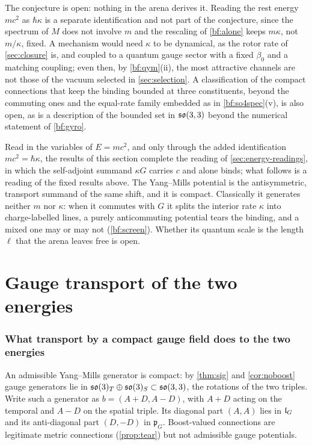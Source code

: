 The conjecture is open: nothing in the arena derives it. Reading the rest energy $mc^2$ as $\hbar\kappa$ is a separate identification and not part of
the conjecture, since the spectrum of $M$ does not involve $m$ and the rescaling of \cref{bf:alone} keeps $m\kappa$, not $m/\kappa$, fixed. A
mechanism would need $\kappa$ to be dynamical, as the rotor rate of \cref{sec:closure} is, and coupled to a quantum gauge sector with a fixed
$\beta_0$ and a matching coupling; even then, by \cref{bf:qym}(ii), the most attractive channels are not those of the vacuum selected in
\cref{sec:selection}. A classification of the compact connections that keep the binding bounded at three constituents, beyond the commuting ones and the equal-rate
family embedded as in \cref{bf:so4spec}(v), is also open, as is a description of the bounded set in $\mathfrak{so}(3,3)$ beyond the numerical statement of
\cref{bf:gyro}.

Read in the variables of $E=mc^2$, and only through the added identification $mc^2=\hbar\kappa$, the results of this section complete the reading
of \cref{sec:energy-readings}, in which the self-adjoint summand $\kappa G$ carries $c$ and alone binds; what follows is a reading of the fixed
results above. The Yang--Mills potential is the antisymmetric, transport summand of the same shift, and it is compact. Classically it generates neither $m$ nor $\kappa$: when it commutes with $G$ it splits the interior rate $\kappa$
into charge-labelled lines, a purely anticommuting potential tears the binding, and a mixed one may or may not (\cref{bf:screen}). Whether
its quantum scale is the length $\ell$ that the arena leaves free is open.

\section{Gauge transport of the two energies}
\label{sec:w:gaugetransportofthetwoen}

\subsubsection{What transport by a compact gauge field does to the two energies}
\label{sec:energy-transport}

An admissible Yang--Mills generator is compact: by \cref{thm:sig} and \cref{cor:noboost} gauge generators lie in $\mathfrak{so}(3)_T\oplus\mathfrak{so}(3)_S\subset\mathfrak{so}(3,3)$,
the rotations of the two triples. Write such a generator as $b=(A+D,A-D)$, with $A+D$ acting on the temporal and $A-D$ on the spatial triple. Its
diagonal part $(A,A)$ lies in $\mathfrak l_G$ and its anti-diagonal part $(D,-D)$ in $\mathfrak p_G$. Boost-valued connections are legitimate metric
connections (\cref{prop:tear}) but not admissible gauge potentials.


